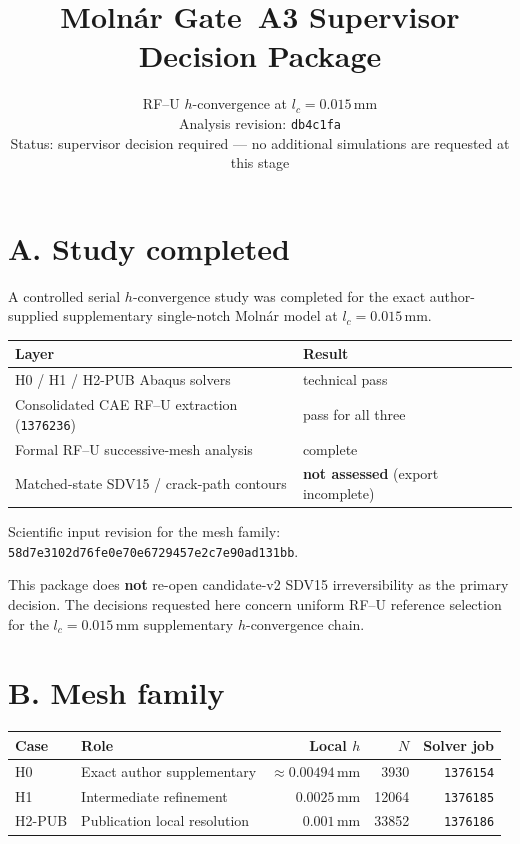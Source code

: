 \documentclass[11pt,a4paper]{article}
\title{Moln\'ar Gate~A3 Supervisor Decision Package}
\author{RF--U $h$-convergence at $l_c=0.015$\,mm\\
\small Analysis revision: \texttt{db4c1fa}\\
\small Status: supervisor decision required --- no additional simulations are requested at this stage}
\date{}
\begin{document}
\maketitle

\section*{A. Study completed}

A controlled serial $h$-convergence study was completed for the exact author-supplied supplementary single-notch Moln\'ar model at $l_c=0.015$\,mm.

\begin{center}
\begin{tabular}{@{}ll@{}}
\toprule
Layer & Result \\
\midrule
H0 / H1 / H2-PUB Abaqus solvers & technical pass \\
Consolidated CAE RF--U extraction (\texttt{1376236}) & pass for all three \\
Formal RF--U successive-mesh analysis & complete \\
Matched-state SDV15 / crack-path contours & \textbf{not assessed} (export incomplete) \\
\bottomrule
\end{tabular}
\end{center}

Scientific input revision for the mesh family: \texttt{58d7e3102d76fe0e70e6729457e2c7e90ad131bb}.

This package does \textbf{not} re-open candidate-v2 SDV15 irreversibility as the primary decision. The decisions requested here concern uniform RF--U reference selection for the $l_c=0.015$\,mm supplementary $h$-convergence chain.

\section*{B. Mesh family}

\begin{center}
\begin{tabular}{@{}llrrr@{}}
\toprule
Case & Role & Local $h$ & $N$ & Solver job \\
\midrule
H0 & Exact author supplementary & $\approx 0.00494$\,mm & 3930 & \texttt{1376154} \\
H1 & Intermediate refinement & $0.0025$\,mm & 12064 & \texttt{1376185} \\
H2-PUB & Publication local resolution & $0.001$\,mm & 33852 & \texttt{1376186} \\
\bottomrule
\end{tabular}
\end{center}
\end{document}
